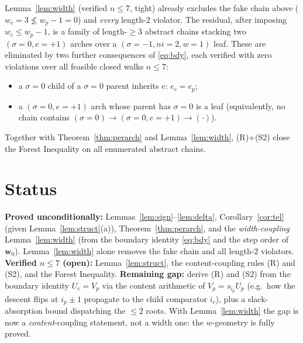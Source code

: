 \documentclass[11pt]{article}
\theoremstyle{plain}
\theoremstyle{remark}
\begin{document}
\noindent Lemma~\ref{lem:width} (verified $n\le7$, tight) already excludes the fake chain above
($w_c=3\not\le w_p-1=0$) and \emph{every} length-$2$ violator. The residual, after imposing
$w_{c}\le w_p-1$, is a family of length-$\ge3$ abstract chains stacking two $(\sigma{=}0,e{=}{+}1)$
arches over a $(\sigma{=}-1,ni{=}2,w{=}1)$ leaf. These are eliminated by two further
consequences of \eqref{eq:bdy}, each verified with zero violations over all feasible closed walks
$n\le7$:
\begin{itemize}
\item[\textbf{(R)}] a $\sigma{=}0$ child of a $\sigma{=}0$ parent inherits $e$: $e_c=e_p$;
\item[\textbf{(S2)}] a $(\sigma{=}0,e{=}{+}1)$ arch whose parent has $\sigma{=}0$ is a leaf
(equivalently, no chain contains $(\sigma{=}0)\to(\sigma{=}0,e{=}{+}1)\to(\cdot)$).
\end{itemize}
Together with Theorem~\ref{thm:perarch} and Lemma~\ref{lem:width}, (R)+(S2) close the Forest
Inequality on all enumerated abstract chains.

\section{Status}
\textbf{Proved unconditionally:} Lemmas~\ref{lem:sign}--\ref{lem:delta},
Corollary~\ref{cor:tel} (given Lemma~\ref{lem:struct}(a)), Theorem~\ref{thm:perarch}, and the
\emph{width-coupling} Lemma~\ref{lem:width} (from the boundary identity \eqref{eq:bdy} and the
step order of $\mathbf w_0$). Lemma~\ref{lem:width} alone removes the fake chain and all
length-$2$ violators.
\textbf{Verified $n\le7$ (open):} Lemma~\ref{lem:struct}, the content-coupling rules (R) and
(S2), and the Forest Inequality.
\textbf{Remaining gap:} derive (R) and (S2) from the boundary identity $U_c=V_p$ via the
content arithmetic of $V_p=s_{i_p}U_p$ (e.g.\ how the descent flips at $i_p\pm1$ propagate to the
child comparator $i_c$), plus a slack-absorption bound dispatching the $\le2$ roots. With
Lemma~\ref{lem:width} the gap is now a \emph{content}-coupling statement, not a width one: the
$w$-geometry is fully proved.
\end{document}
